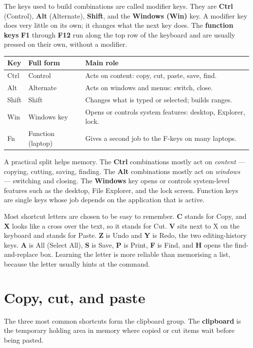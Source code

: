 The keys used to build combinations are called modifier keys. They are
\textbf{Ctrl} (Control), \textbf{Alt} (Alternate), \textbf{Shift}, and the
\textbf{Windows (Win)} key. A modifier key does very little on its own; it
changes what the next key does. The \textbf{function keys} \textbf{F1} through
\textbf{F12} run along the top row of the keyboard and are usually pressed on
their own, without a modifier.

\begin{center}
\begin{tabular}{p{}p{}p{}}
\toprule
\textbf{Key} & \textbf{Full form} & \textbf{Main role} \\
\midrule
Ctrl & Control & Acts on content: copy, cut, paste, save, find. \\
Alt & Alternate & Acts on windows and menus: switch, close. \\
Shift & Shift & Changes what is typed or selected; builds ranges. \\
Win & Windows key & Opens or controls system features: desktop, Explorer, lock. \\
Fn & Function (laptop) & Gives a second job to the F-keys on many laptops. \\
\bottomrule
\end{tabular}
\end{center}

A practical split helps memory. The \textbf{Ctrl} combinations mostly act on
\emph{content} --- copying, cutting, saving, finding. The \textbf{Alt}
combinations mostly act on \emph{windows} --- switching and closing. The
\textbf{Windows} key opens or controls system-level features such as the
desktop, File Explorer, and the lock screen. Function keys are single keys
whose job depends on the application that is active.

Most shortcut letters are chosen to be easy to remember. \textbf{C} stands for
Copy, and \textbf{X} looks like a cross over the text, so it stands for Cut.
\textbf{V} sits next to X on the keyboard and stands for Paste. \textbf{Z} is
Undo and \textbf{Y} is Redo, the two editing-history keys. \textbf{A} is All
(Select All), \textbf{S} is Save, \textbf{P} is Print, \textbf{F} is Find, and
\textbf{H} opens the find-and-replace box. Learning the letter is more reliable
than memorising a list, because the letter usually hints at the command.

\section{Copy, cut, and paste}
The three most common shortcuts form the clipboard group. The
\textbf{clipboard} is the temporary holding area in memory where copied or cut
items wait before being pasted.

